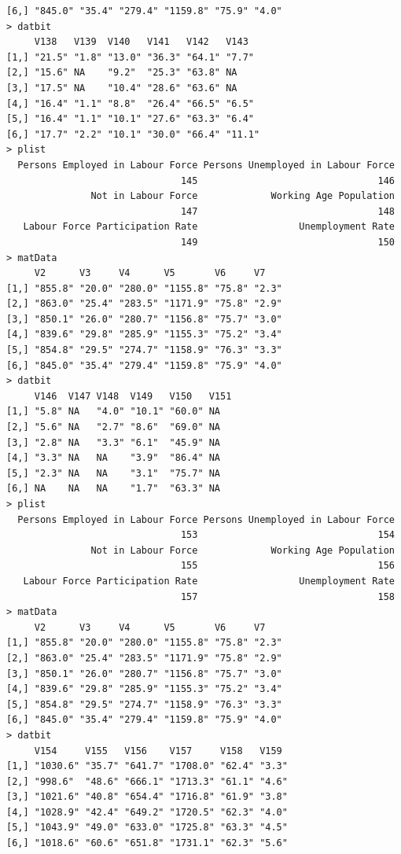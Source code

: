 \documentclass[a4paper]{article}
\begin{document}
\begin{verbatim}
[6,] "845.0" "35.4" "279.4" "1159.8" "75.9" "4.0"
> datbit 
     V138   V139  V140   V141   V142   V143  
[1,] "21.5" "1.8" "13.0" "36.3" "64.1" "7.7" 
[2,] "15.6" NA    "9.2"  "25.3" "63.8" NA    
[3,] "17.5" NA    "10.4" "28.6" "63.6" NA    
[4,] "16.4" "1.1" "8.8"  "26.4" "66.5" "6.5" 
[5,] "16.4" "1.1" "10.1" "27.6" "63.3" "6.4" 
[6,] "17.7" "2.2" "10.1" "30.0" "66.4" "11.1"
> plist 
  Persons Employed in Labour Force Persons Unemployed in Labour Force 
                               145                                146 
               Not in Labour Force             Working Age Population 
                               147                                148 
   Labour Force Participation Rate                  Unemployment Rate 
                               149                                150 
> matData 
     V2      V3     V4      V5       V6     V7   
[1,] "855.8" "20.0" "280.0" "1155.8" "75.8" "2.3"
[2,] "863.0" "25.4" "283.5" "1171.9" "75.8" "2.9"
[3,] "850.1" "26.0" "280.7" "1156.8" "75.7" "3.0"
[4,] "839.6" "29.8" "285.9" "1155.3" "75.2" "3.4"
[5,] "854.8" "29.5" "274.7" "1158.9" "76.3" "3.3"
[6,] "845.0" "35.4" "279.4" "1159.8" "75.9" "4.0"
> datbit 
     V146  V147 V148  V149   V150   V151
[1,] "5.8" NA   "4.0" "10.1" "60.0" NA  
[2,] "5.6" NA   "2.7" "8.6"  "69.0" NA  
[3,] "2.8" NA   "3.3" "6.1"  "45.9" NA  
[4,] "3.3" NA   NA    "3.9"  "86.4" NA  
[5,] "2.3" NA   NA    "3.1"  "75.7" NA  
[6,] NA    NA   NA    "1.7"  "63.3" NA  
> plist 
  Persons Employed in Labour Force Persons Unemployed in Labour Force 
                               153                                154 
               Not in Labour Force             Working Age Population 
                               155                                156 
   Labour Force Participation Rate                  Unemployment Rate 
                               157                                158 
> matData 
     V2      V3     V4      V5       V6     V7   
[1,] "855.8" "20.0" "280.0" "1155.8" "75.8" "2.3"
[2,] "863.0" "25.4" "283.5" "1171.9" "75.8" "2.9"
[3,] "850.1" "26.0" "280.7" "1156.8" "75.7" "3.0"
[4,] "839.6" "29.8" "285.9" "1155.3" "75.2" "3.4"
[5,] "854.8" "29.5" "274.7" "1158.9" "76.3" "3.3"
[6,] "845.0" "35.4" "279.4" "1159.8" "75.9" "4.0"
> datbit 
     V154     V155   V156    V157     V158   V159 
[1,] "1030.6" "35.7" "641.7" "1708.0" "62.4" "3.3"
[2,] "998.6"  "48.6" "666.1" "1713.3" "61.1" "4.6"
[3,] "1021.6" "40.8" "654.4" "1716.8" "61.9" "3.8"
[4,] "1028.9" "42.4" "649.2" "1720.5" "62.3" "4.0"
[5,] "1043.9" "49.0" "633.0" "1725.8" "63.3" "4.5"
[6,] "1018.6" "60.6" "651.8" "1731.1" "62.3" "5.6"

\end{verbatim}
\end{document}
